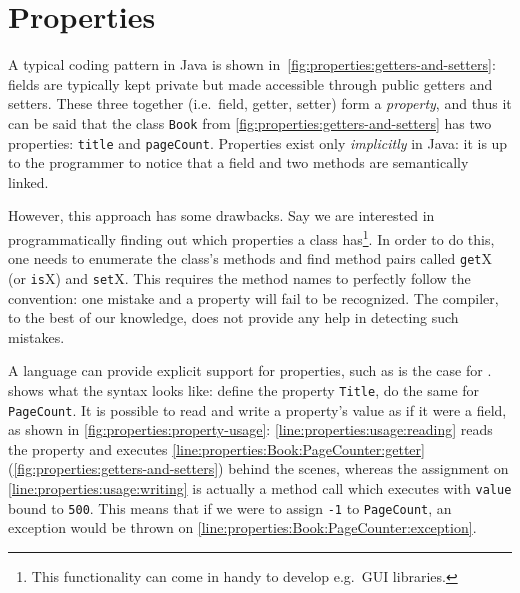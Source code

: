 \section{Properties}
A typical coding pattern in Java is shown in~\cref{fig:properties:getters-and-setters}:
fields are typically kept private but made accessible through
public getters and setters. These three together (i.e.\ field, getter, setter)
form a \emph{property}, and thus it can be said that the class {\tt Book} from
\cref{fig:properties:getters-and-setters} has two properties: {\tt title} and {\tt pageCount}.
Properties exist only \emph{implicitly} in Java: it is up to the programmer
to notice that a field and two methods are semantically linked.


However, this approach has some drawbacks.
Say we are interested in programmatically finding out which properties a class has\footnote{This functionality
can come in handy to develop e.g.\ GUI libraries.}. In order
to do this, one needs to enumerate the class's methods and find method pairs
called {\tt get}X (or {\tt is}X) and {\tt set}X. This requires the method names
to perfectly follow the convention: one mistake and a property will fail to be recognized.
The compiler, to the best of our knowledge, does not provide any help in detecting such mistakes.

A language can provide explicit support for properties, such as is the case for \csharp.
 shows what the syntax looks like:
 define
the property {\tt Title}, 
do the same for {\tt PageCount}. It is possible to read and write a property's value as if
it were a field, as shown in \cref{fig:properties:property-usage}:
\cref{line:properties:usage:reading} reads the property and executes \cref{line:properties:Book:PageCounter:getter} (\cref{fig:properties:getters-and-setters}) behind the scenes,
whereas the assignment on \cref{line:properties:usage:writing} is actually a method call which executes
 with {\tt value} bound to {\tt 500}.
This means that if we were to assign {\tt -1} to {\tt PageCount}, an exception would be thrown on \cref{line:properties:Book:PageCounter:exception}.




